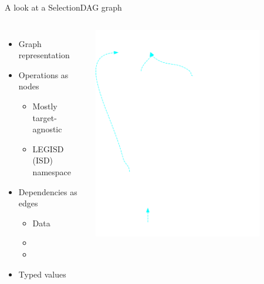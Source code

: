 \begin{frame}{A look at a SelectionDAG graph}

\begin{columns}[t]
    \begin{itemize}
        \item Graph representation
        \item Operations as nodes
        \begin{itemize}
            \item Mostly target-agnostic
            \item LEGISD (ISD) namespace
        \end{itemize}
        \item Dependencies as edges
        \begin{itemize}
            \item Data
            \item {}
            \item {}
        \end{itemize}
        \item Typed values
    \end{itemize}
    \begin{block}{}
        \includegraphics[width = 0.8\textwidth]{examples/ex1-entry-selection-dag.png}
    \end{block}
\end{columns}

\end{frame}

